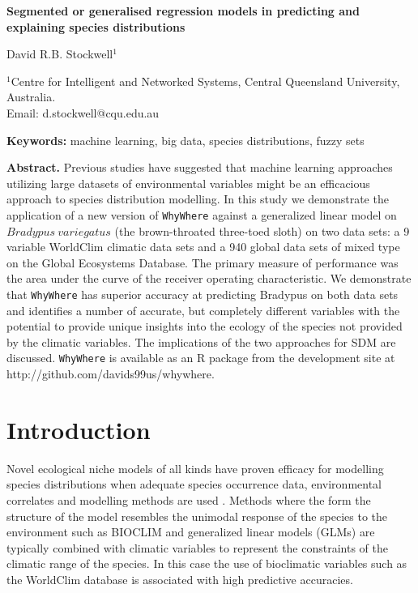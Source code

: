 \documentclass[10pt]{article}
\begin{document}


{
\begin{center}
\textsf{\Large \textbf{Segmented or generalised regression models in predicting and explaining species distributions}}

\textsf{\large David R.B. Stockwell$^1$}


\textsf{ $^1$Centre for Intelligent and Networked Systems, Central Queensland University, Australia. \\
Email: d.stockwell@cqu.edu.au}
\end{center}

\textsf{ \textbf{Keywords:} machine learning, big data, species distributions, fuzzy sets}}
\vspace{5mm}

\textbf{Abstract.} Previous studies have suggested that machine learning approaches utilizing large datasets of environmental variables might be an efficacious approach to species distribution modelling.  In this study we demonstrate the application of a new version of \texttt{WhyWhere} against a generalized linear model on $Bradypus~variegatus$ (the brown-throated three-toed sloth) on two data sets: a 9 variable WorldClim climatic data sets and a 940 global data sets of mixed type on the Global Ecosystems Database.  The primary measure of performance was the area under the curve of the receiver operating characteristic.  We demonstrate that \texttt{WhyWhere} has superior accuracy at predicting Bradypus on both data sets and identifies a number of accurate, but completely different variables with the potential to  provide unique insights into the ecology of the species not provided by the climatic variables.  The implications of the two approaches for SDM are discussed. \texttt{WhyWhere} is available as an R package from the development site at http://github.com/davids99us/whywhere.

\section{Introduction} 

Novel ecological niche models of all kinds have proven efficacy for modelling species distributions when adequate species occurrence data, environmental correlates and modelling methods are used \cite{citeulike:585800}. Methods where the form the structure of the model resembles the unimodal response of the species to the environment such as BIOCLIM \cite{Nix:1986yg} and generalized linear models (GLMs) \cite{Austin:1996np} are typically combined with climatic variables to represent the constraints of the climatic range of the species.  In this case the use of bioclimatic variables such as the WorldClim database \cite{Hijmans2005} is associated with high predictive accuracies.   
\end{document}
